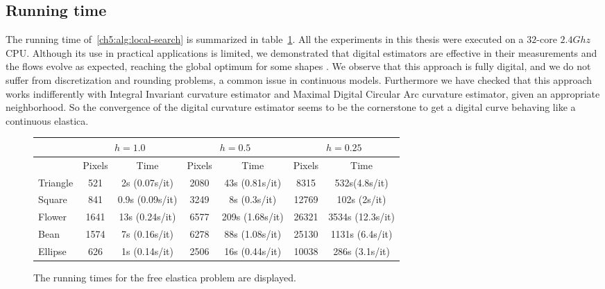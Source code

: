 \subsection{Running time}
\label{ch5:subsec:running-time}

The running time of~\cref{ch5:alg:local-search} is summarized in table~\cref{tab:summary-local-comb-rtime}. All the experiments in this thesis were executed on a $32$-core $2.4Ghz$ CPU. Although its use in practical applications is
limited, we demonstrated that digital estimators are effective in their measurements and the flows evolve as expected, reaching the global optimum for some shapes . We
observe that this approach is fully digital, and we do not suffer from discretization and rounding problems, a common
issue in continuous models.  Furthermore we have checked that this approach works indifferently with Integral Invariant
curvature estimator and Maximal Digital Circular Arc curvature estimator, given an appropriate neighborhood. So the convergence of the digital curvature
estimator seems to be the cornerstone to get a digital curve behaving like a continuous elastica. 

\begin{figure}[h!]
\center
\captionsetup{type=table}
\footnotesize
\begin{tabular}{|l|c|c|c|c|c|c|}
\hline
& \multicolumn{2}{c|}{$h=1.0$} & \multicolumn{2}{c|}{$h=0.5$} & \multicolumn{2}{c|}{$h=0.25$}\\
\hline
& Pixels & Time & Pixels & Time & Pixels & Time\\
\hline
Triangle & 521 & 2s (0.07s/it)  & 2080 & 43s (0.81s/it) & 8315 & 532s(4.8s/it)\\
Square & 841 & 0.9s (0.09s/it) & 3249 & 8s (0.3s/it) & 12769 & 102s (2s/it)\\
Flower & 1641 & 13s (0.24s/it) & 6577 & 209s (1.68s/it) & 26321 & 3534s (12.3s/it)\\
Bean  & 1574 & 7s (0.16s/it) & 6278 & 88s (1.08s/it) & 25130 & 1131s (6.4s/it)\\
Ellipse  & 626 & 1s (0.14s/it) & 2506 & 16s (0.44s/it) & 10038 & 286s (3.1s/it)\\
\hline
\end{tabular}
\caption{ The running times for the free elastica problem are displayed. }
\label{tab:summary-local-comb-rtime} 
\end{figure}





